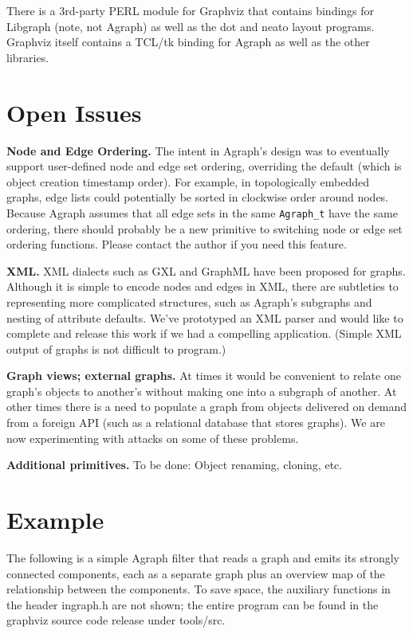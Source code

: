 \documentclass[11pt,letterpaper]{article}
\begin{document}
There is a 3rd-party PERL module for Graphviz that contains bindings for
Libgraph (note, not Agraph) as well as the dot and neato layout programs.
Graphviz itself contains a TCL/tk binding for Agraph as well as the
other libraries.

\section{Open Issues}
\label{sec:openissues}

{\bf Node and Edge Ordering.} The intent in Agraph's design was to
eventually support user-defined node and edge set ordering, overriding
the default (which is object creation timestamp order).  For example,
in topologically embedded graphs, edge lists could potentially be sorted
in clockwise order around nodes.
Because Agraph assumes that all edge sets in the same \verb"Agraph_t"
have the same ordering, there should probably be a new primitive to
switching node or edge set ordering functions.  Please contact the
author if you need this feature.

{\bf XML.}  XML dialects such as GXL and GraphML have been proposed
for graphs.  Although it is simple to encode nodes and edges in XML,
there are subtleties to representing more complicated structures, such as
Agraph's subgraphs and nesting of attribute defaults.
We've prototyped an XML parser and would like to complete and release
this work if we had a compelling application.  (Simple XML output of
graphs is not difficult to program.)

{\bf Graph views; external graphs.}  At times it would be convenient
to relate one graph's objects to another's without making one into a
subgraph of another.  At other times there is a need to populate
a graph from objects delivered on demand from a foreign API (such as a
relational database that stores graphs).  We are now experimenting with
attacks on some of these problems.

{\bf Additional primitives.}  To be done: Object renaming, cloning, etc.

\section{Example}
\label{sec:example}

The following is a simple Agraph filter that reads a graph and
emits its strongly connected components, each as a separate graph
plus an overview map of the relationship between the components.
To save space, the auxiliary functions in the header ingraph.h
are not shown; the entire program can be found in the graphviz
source code release under tools/src.
\end{document}

